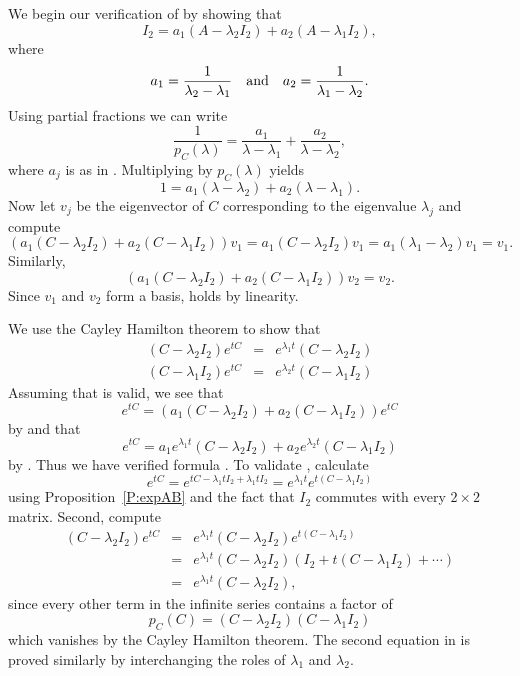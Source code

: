 \documentclass{ximera}
\begin{document}
We begin our verification of  by showing that
\begin{equation}  \label{E:Inpart}
I_2 = a_1 (A - \lambda_2I_2) + a_2 (A - \lambda_1I_2),
\end{equation}
where
\begin{equation}  \label{E:pfcoeff}
a_1 = \frac{1}{\lambda_2-\lambda_1} \AND a_2 = \frac{1}{\lambda_1-\lambda_2}.
\end{equation}
Using partial fractions we can write
\begin{equation}  \label{E:partfrac}
\frac{1}{p_C(\lambda)} = \frac{a_1}{\lambda-\lambda_1} +
\frac{a_2}{\lambda-\lambda_2},
\end{equation}
where $a_j$ is as in .
Multiplying  by $p_C(\lambda)$ yields
\[
1 = a_1 (\lambda-\lambda_2) + a_2 (\lambda-\lambda_1).
\]
Now let $v_j$ be the eigenvector of $C$ corresponding to the eigenvalue
$\lambda_j$ and compute
\[
(a_1 (C - \lambda_2I_2) + a_2 (C - \lambda_1I_2))v_1 =
a_1(C - \lambda_2I_2)v_1 = a_1(\lambda_1-\lambda_2)v_1 = v_1.
\]
Similarly,
\[
(a_1 (C - \lambda_2I_2) + a_2 (C - \lambda_1I_2))v_2 = v_2.
\]
Since $v_1$ and $v_2$ form a basis,  holds by linearity.

We use the Cayley Hamilton theorem to show that
\begin{equation}  \label{E:almost}
\begin{array}{rcl}
(C - \lambda_2I_2)e^{tC} & = & e^{\lambda_1 t}(C - \lambda_2I_2)\\
(C - \lambda_1I_2)e^{tC} & = & e^{\lambda_2 t}(C - \lambda_1I_2)
\end{array}
\end{equation}
Assuming that  is valid, we see that
\[
e^{tC} = (a_1 (C - \lambda_2I_2) + a_2 (C - \lambda_1I_2))e^{tC}
\]
by  and that
\[
e^{tC} = a_1 e^{\lambda_1 t}(C - \lambda_2I_2) +
a_2 e^{\lambda_2 t}(C - \lambda_1I_2)
\]
by .  Thus we have verified formula .
To validate , calculate
\[
e^{tC} = e^{tC - \lambda_1 tI_2 + \lambda_1 tI_2} =
e^{\lambda_1t}e^{t(C - \lambda_1 I_2)}
\]
using Proposition~\ref{P:expAB} and the fact that $I_2$ commutes with every
$2\times 2$ matrix.  Second, compute
\begin{eqnarray*}
(C - \lambda_2I_2)e^{tC} & = &
e^{\lambda_1 t}(C - \lambda_2I_2)e^{t(C - \lambda_1 I_2)} \\
& = &  e^{\lambda_1 t}(C - \lambda_2I_2)(I_2 + t(C - \lambda_1 I_2) + \cdots)\\
& = & e^{\lambda_1 t}(C - \lambda_2I_2),
\end{eqnarray*}
since every other term in the infinite series contains a factor of
\[
p_C(C) = (C - \lambda_2I_2)(C - \lambda_1 I_2)
\]
which vanishes by the Cayley Hamilton theorem.  The second equation in
 is proved similarly by interchanging the roles of $\lambda_1$
and $\lambda_2$.
\end{document}

